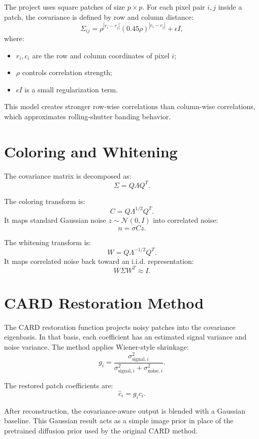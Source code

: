 \documentclass[12pt,a4paper]{article}
\begin{document}
The project uses square patches of size \(p \times p\). For each pixel pair
\(i,j\) inside a patch, the covariance is defined by row and column distance:
\[
  \Sigma_{ij}
  =
  \rho^{|r_i-r_j|}
  (0.45\rho)^{|c_i-c_j|}
  +
  \epsilon I,
\]
where:

\begin{itemize}
  \item \(r_i, c_i\) are the row and column coordinates of pixel \(i\);
  \item \(\rho\) controls correlation strength;
  \item \(\epsilon I\) is a small regularization term.
\end{itemize}

This model creates stronger row-wise correlations than column-wise correlations,
which approximates rolling-shutter banding behavior.

\section{Coloring and Whitening}

The covariance matrix is decomposed as:
\[
  \Sigma = Q \Lambda Q^T.
\]

The coloring transform is:
\[
  C = Q\Lambda^{1/2}Q^T.
\]
It maps standard Gaussian noise \(z \sim \mathcal{N}(0,I)\) into correlated
noise:
\[
  n = \sigma C z.
\]

The whitening transform is:
\[
  W = Q\Lambda^{-1/2}Q^T.
\]
It maps correlated noise back toward an i.i.d. representation:
\[
  W \Sigma W^T \approx I.
\]

\section{CARD Restoration Method}

The CARD restoration function projects noisy patches into the covariance
eigenbasis. In that basis, each coefficient has an estimated signal variance and
noise variance. The method applies Wiener-style shrinkage:
\[
  g_i =
  \frac{\sigma^2_{\text{signal},i}}
  {\sigma^2_{\text{signal},i} + \sigma^2_{\text{noise},i}}.
\]

The restored patch coefficients are:
\[
  \hat{c}_i = g_i c_i.
\]

After reconstruction, the covariance-aware output is blended with a Gaussian
baseline. This Gaussian result acts as a simple image prior in place of the
pretrained diffusion prior used by the original CARD method.
\end{document}
